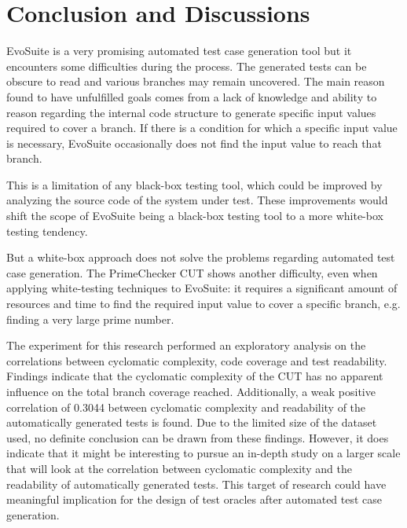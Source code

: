 \section{Conclusion and Discussions}

EvoSuite is a very promising automated test case generation tool but it encounters some difficulties during the process.
The generated tests can be obscure to read and various branches may remain uncovered.
The main reason found to have unfulfilled goals comes from a lack of knowledge and ability to reason regarding the internal code structure to generate specific input values required to cover a branch.
If there is a condition for which a specific input value is necessary, EvoSuite occasionally does not find the input value to reach that branch.

This is a limitation of any black-box testing tool, which could be improved by analyzing the source code of the system under test.
These improvements would shift the scope of EvoSuite being a black-box testing tool to a more white-box testing tendency.

But a white-box approach does not solve the problems regarding automated test case generation.
The PrimeChecker CUT shows another difficulty, even when applying white-testing techniques to EvoSuite: it requires a significant amount of resources and time to find the required input value to cover a specific branch, e.g. finding a very large prime number.

The experiment for this research performed an exploratory analysis on the correlations between cyclomatic complexity, code coverage and test readability.
Findings indicate that the cyclomatic complexity of the CUT has no apparent influence on the total branch coverage reached.
Additionally, a weak positive correlation of 0.3044 between cyclomatic complexity and readability of the automatically generated tests is found.
Due to the limited size of the dataset used, no definite conclusion can be drawn from these findings.
However, it does indicate that it might be interesting to pursue an in-depth study on a larger scale that will look at the correlation between cyclomatic complexity and the readability of automatically generated tests.
This target of research could have meaningful implication for the design of test oracles after automated test case generation. 